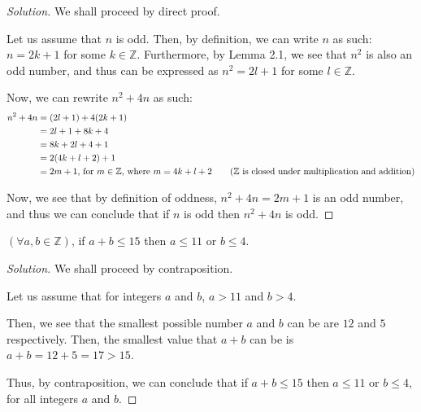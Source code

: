 \documentclass{article}
\newenvironment{solution}{\begin{proof}[Solution]}{\end{proof}}
\newcommand{\all}{\forall}
\newcommand{\ZZ}{\mathbb{Z}}
\begin{document}
\begin{solution}
	We shall proceed by direct proof.
	
	Let us assume that $n$ is odd. Then, by definition, we can write $n$ as such: $n = 2k+1$ for some $k \in \ZZ$. Furthermore, by Lemma 2.1, we see that $n^{2}$ is also an odd number, and thus can be expressed as $n^{2} = 2l + 1$ for some $l \in \ZZ$.
	
	Now, we can rewrite $n^{2} + 4n$ as such:
	\begin{align*}
		n^{2} + 4n &= (2l+1) + 4(2k+1) \\
		&= 2l+1 + 8k + 4 \\
		&= 8k + 2l + 4 + 1 \\
		&= 2(4k+l+2) + 1 \\
		&= 2m + 1\text{, for $m \in \ZZ$, where $m=4k+l+2$} \tag{$\ZZ$ is closed under multiplication and addition}
	\end{align*}

	Now, we see that by definition of oddness, $n^{2}+4n = 2m + 1$ is an odd number, and thus we can conclude that if $ n $ is odd then $ n^{2} + 4n $ is odd.
\end{solution}

\begin{hw}
$	\left( \all a,b \in \ZZ \right)$, if $a+b \leq 15$ then $a \leq 11$ or $b \leq 4$.
\end{hw}
\begin{solution}
	
	We shall proceed by contraposition.
	
	Let us assume that for integers $a$ and $b$, $a > 11$ and $b > 4$. 
	
	Then, we see that the smallest possible number $a$ and $b$ can be are $12$ and $5$ respectively. Then, the smallest value that $a+b$ can be is $a+b = 12 + 5 = 17 > 15$.
	
	Thus, by contraposition, we can conclude that if $a+b \leq 15$ then $a \leq 11$ or $b \leq 4$, for all integers $a$ and $b$.
\end{solution}
\end{document}

